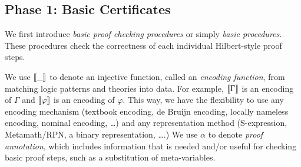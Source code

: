 \documentclass{article}
\begin{document}
\subsection{Phase 1: Basic Certificates}

We first introduce \emph{basic proof checking procedures} or simply
\emph{basic procedures}.
These procedures check the correctness of each individual
Hilbert-style proof steps.

We use $\left\llbracket \_ \right\rrbracket$ to denote an injective function,
called an \emph{encoding function},
from matching logic patterns and theories into data. 
For example, 
$\left\llbracket \Gamma \right\rrbracket$ is an encoding of $\Gamma$ and $\left\llbracket \varphi \right\rrbracket$ is an encoding of $\varphi$. 
This way, we have the flexibility to use any encoding mechanism
(textbook encoding, de Bruijn encoding, locally nameless encoding, nominal encoding, \ldots)
and any representation method (S-expression, Metamath/RPN, a binary representation, \ldots.)
We use $\alpha$ to denote \emph{proof annotation}, which includes information
that is needed and/or useful for checking basic proof steps,
such as a substitution of meta-variables. 
\end{document}
